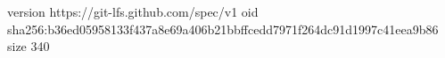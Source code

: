 version https://git-lfs.github.com/spec/v1
oid sha256:b36ed05958133f437a8e69a406b21bbffcedd7971f264dc91d1997c41eea9b86
size 340
